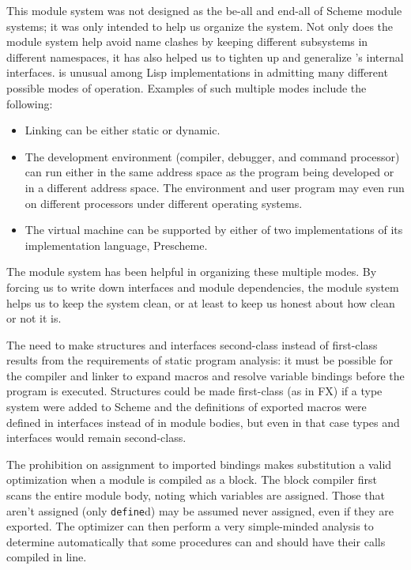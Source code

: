 This module system was not designed as the be-all and end-all of
Scheme module systems; it was only intended to help us
organize the \hack{} system.  Not only does the module system
help avoid name clashes by keeping different subsystems in different
namespaces, it has also helped us to tighten up and generalize
\hack{}'s internal interfaces.  \hack{} is unusual among Lisp
implementations in admitting many different possible modes of
operation.  Examples of such multiple modes include the following:
\begin{itemize}
    \item Linking can be either static or dynamic.

    \item The development environment (compiler, debugger, and command
    processor) can run either in the same address space as the program
    being developed or in a different address space.  The environment and
    user program may even run on different processors under different
    operating systems\cite{Rees-Donald:Program}.

    \item The virtual machine can be supported by either
    of two implementations of its implementation language, Prescheme.
\end{itemize}
The module system has been helpful in organizing these multiple modes.
By forcing us to write down interfaces and module dependencies, the
module system helps us to keep the system clean, or at least to keep
us honest about how clean or not it is.

The need to make structures and interfaces second-class instead of
first-class results from the requirements of static program analysis:
it must be possible for the compiler and linker to expand macros and
resolve variable bindings before the program is executed.  Structures
could be made first-class (as in FX\cite{Sheldon-Gifford:Static}) if a
type system were added to Scheme and the definitions of exported
macros were defined in interfaces instead of in module bodies, but
even in that case types and interfaces would remain second-class.

The prohibition on assignment to imported bindings makes substitution
a valid optimization when a module is compiled as a block.  The block
compiler first scans the entire module body, noting which variables
are assigned.  Those that aren't assigned (only {\tt define}d) may be
assumed never assigned, even if they are exported.  The optimizer can
then perform a very simple-minded analysis to determine automatically
that some procedures can and should have their calls compiled in line.

